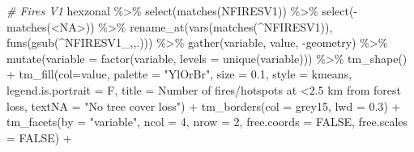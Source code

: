 \documentclass[10pt,landscape,a3paper]{article}
\newenvironment{Shaded}{\begin{snugshade}}{\end{snugshade}}
\newcommand{\AttributeTok}[1]{\textcolor[rgb]{0.77,0.63,0.00}{#1}}
\newcommand{\CommentTok}[1]{\textcolor[rgb]{0.56,0.35,0.01}{\textit{#1}}}
\newcommand{\ConstantTok}[1]{\textcolor[rgb]{0.00,0.00,0.00}{#1}}
\newcommand{\DecValTok}[1]{\textcolor[rgb]{0.00,0.00,0.81}{#1}}
\newcommand{\FloatTok}[1]{\textcolor[rgb]{0.00,0.00,0.81}{#1}}
\newcommand{\FunctionTok}[1]{\textcolor[rgb]{0.00,0.00,0.00}{#1}}
\newcommand{\NormalTok}[1]{#1}
\newcommand{\SpecialCharTok}[1]{\textcolor[rgb]{0.00,0.00,0.00}{#1}}
\newcommand{\StringTok}[1]{\textcolor[rgb]{0.31,0.60,0.02}{#1}}
\begin{document}
\begin{Shaded}
\begin{Highlighting}[]

\CommentTok{\# Fires V1}
\NormalTok{hexzonal }\SpecialCharTok{\%\textgreater{}\%} \FunctionTok{select}\NormalTok{(}\FunctionTok{matches}\NormalTok{(}\StringTok{\textquotesingle{}NFIRESV1\textquotesingle{}}\NormalTok{)) }\SpecialCharTok{\%\textgreater{}\%} \FunctionTok{select}\NormalTok{(}\SpecialCharTok{{-}}\FunctionTok{matches}\NormalTok{(}\StringTok{\textquotesingle{}\textless{}NA\textgreater{}\textquotesingle{}}\NormalTok{)) }\SpecialCharTok{\%\textgreater{}\%} 
  \FunctionTok{rename\_at}\NormalTok{(}\FunctionTok{vars}\NormalTok{(}\FunctionTok{matches}\NormalTok{(}\StringTok{\textquotesingle{}\^{}NFIRESV1\textquotesingle{}}\NormalTok{)), }\FunctionTok{funs}\NormalTok{(}\FunctionTok{gsub}\NormalTok{(}\StringTok{\textquotesingle{}\^{}NFIRESV1\_\textquotesingle{}}\NormalTok{,}\StringTok{\textquotesingle{}\textquotesingle{}}\NormalTok{,.))) }\SpecialCharTok{\%\textgreater{}\%} 
  \FunctionTok{gather}\NormalTok{(variable, value, }\SpecialCharTok{{-}}\NormalTok{geometry) }\SpecialCharTok{\%\textgreater{}\%}
  \FunctionTok{mutate}\NormalTok{(}\AttributeTok{variable =} \FunctionTok{factor}\NormalTok{(variable, }\AttributeTok{levels =} \FunctionTok{unique}\NormalTok{(variable))) }\SpecialCharTok{\%\textgreater{}\%} 
  \FunctionTok{tm\_shape}\NormalTok{() }\SpecialCharTok{+}
  \FunctionTok{tm\_fill}\NormalTok{(}\AttributeTok{col=}\StringTok{\textquotesingle{}value\textquotesingle{}}\NormalTok{, }\AttributeTok{palette =} \StringTok{"YlOrBr"}\NormalTok{, }\AttributeTok{size =} \FloatTok{0.1}\NormalTok{,}
          \AttributeTok{style =} \StringTok{\textquotesingle{}kmeans\textquotesingle{}}\NormalTok{, }\AttributeTok{legend.is.portrait =}\NormalTok{ F, }\AttributeTok{title =} \StringTok{\textquotesingle{}Number of fires/hotspots at \textless{}2.5 km from forest loss\textquotesingle{}}\NormalTok{,}
          \AttributeTok{textNA =} \StringTok{"No tree cover loss"}\NormalTok{) }\SpecialCharTok{+}
  \FunctionTok{tm\_borders}\NormalTok{(}\AttributeTok{col =} \StringTok{\textquotesingle{}grey15\textquotesingle{}}\NormalTok{, }\AttributeTok{lwd =} \FloatTok{0.3}\NormalTok{) }\SpecialCharTok{+}
  \FunctionTok{tm\_facets}\NormalTok{(}\AttributeTok{by =} \StringTok{"variable"}\NormalTok{, }\AttributeTok{ncol =} \DecValTok{4}\NormalTok{, }\AttributeTok{nrow =} \DecValTok{2}\NormalTok{, }\AttributeTok{free.coords =} \ConstantTok{FALSE}\NormalTok{, }\AttributeTok{free.scales =} \ConstantTok{FALSE}\NormalTok{) }\SpecialCharTok{+}

\end{Highlighting}
\end{Shaded}
\end{document}
